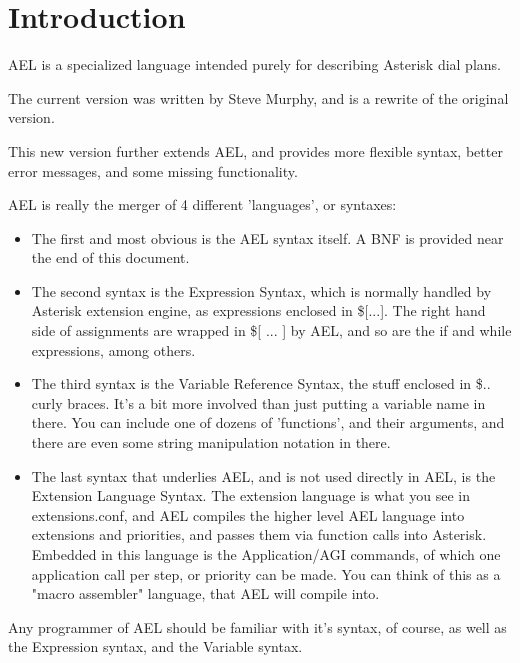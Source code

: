\section{Introduction}

AEL is a specialized language intended purely for
describing Asterisk dial plans.

The current version was written by Steve Murphy, and is a rewrite of
the original version.

This new version further extends AEL, and
provides more flexible syntax, better error messages, and some missing
functionality.

AEL is really the merger of 4 different 'languages', or syntaxes:

\begin{itemize}
    \item The first and most obvious is the AEL syntax itself. A BNF is
      provided near the end of this document.

    \item The second syntax is the Expression Syntax, which is normally
     handled by Asterisk extension engine, as expressions enclosed in
     \$[...]. The right hand side of assignments are wrapped in \$[ ... ]
     by AEL, and so are the if and while expressions, among others.

    \item The third syntax is the Variable Reference Syntax, the stuff
      enclosed in \${..} curly braces. It's a bit more involved than just
      putting a variable name in there. You can include one of dozens of
      'functions', and their arguments, and there are even some string
      manipulation notation in there.

    \item The last syntax that underlies AEL, and is not used
      directly in AEL, is the Extension Language Syntax. The
      extension language is what you see in extensions.conf, and AEL
      compiles the higher level AEL language into extensions and
      priorities, and passes them via function calls into
      Asterisk. Embedded in this language is the Application/AGI
      commands, of which one application call per step, or priority
      can be made. You can think of this as a "macro assembler"
      language, that AEL will compile into.
\end{itemize}

Any programmer of AEL should be familiar with it's syntax, of course,
as well as the Expression syntax, and the Variable syntax.


